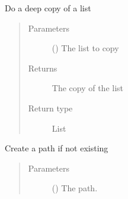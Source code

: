\documentclass[a4paper,10pt,english]{sphinxmanual}
\begin{document}

\begin{fulllineitems}
\label{\detokenize{commands/apidoc/src:src.deepcopy_list}}
Do a deep copy of a list
\begin{quote}\begin{description}
\item[{Parameters}] \leavevmode
{} () \textendash{} The list to copy

\item[{Returns}] \leavevmode
The copy of the list

\item[{Return type}] \leavevmode
List

\end{description}\end{quote}

\end{fulllineitems}


\begin{fulllineitems}
\label{\detokenize{commands/apidoc/src:src.ensure_path_exists}}
Create a path if not existing
\begin{quote}\begin{description}
\item[{Parameters}] \leavevmode
{} () \textendash{} The path.

\end{description}\end{quote}

\end{fulllineitems}

\end{document}
